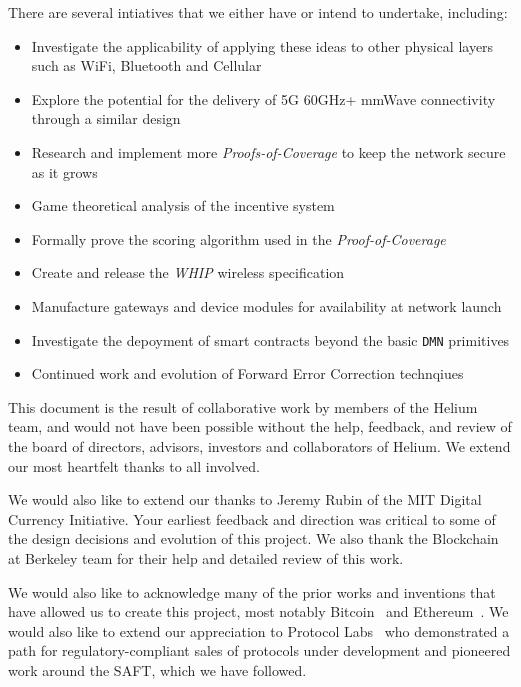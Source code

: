 \documentclass[10pt, nonatbib, nocopyrightspace, reprint]{sigplanconf}
\begin{document}
There are several intiatives that we either have or intend to undertake, including:

\begin{itemize}
    \item Investigate the applicability of applying these ideas to other physical layers such as WiFi, Bluetooth and Cellular
    \item Explore the potential for the delivery of 5G 60GHz+ mmWave connectivity through a similar design
    \item Research and implement more \emph{Proofs-of-Coverage} to keep the network secure as it grows
    \item Game theoretical analysis of the incentive system
    \item Formally prove the scoring algorithm used in the \emph{Proof-of-Coverage}
    \item Create and release the \emph{WHIP} wireless specification
    \item Manufacture gateways and device modules for availability at network launch
    \item Investigate the depoyment of smart contracts beyond the basic \verb|DMN| primitives
    \item Continued work and evolution of Forward Error Correction technqiues
\end{itemize}

\acks

This document is the result of collaborative work by members of the Helium team, and would not have been possible without the help, feedback, and review of the board of directors, advisors, investors and collaborators of Helium. We extend our most heartfelt thanks to all involved.

We would also like to extend our thanks to Jeremy Rubin of the MIT Digital Currency Initiative. Your earliest feedback and direction was critical to some of the design decisions and evolution of this project. We also thank the Blockchain at Berkeley team for their help and detailed review of this work.

We would also like to acknowledge many of the prior works and inventions that have allowed us to create this project, most notably Bitcoin~\cite{bitcoin} and Ethereum~\cite{ethereum}. We would also like to extend our appreciation to Protocol Labs~\cite{protocol} who demonstrated a path for regulatory-compliant sales of protocols under development and pioneered work around the SAFT, which we have followed.
\newpage
\end{document}

